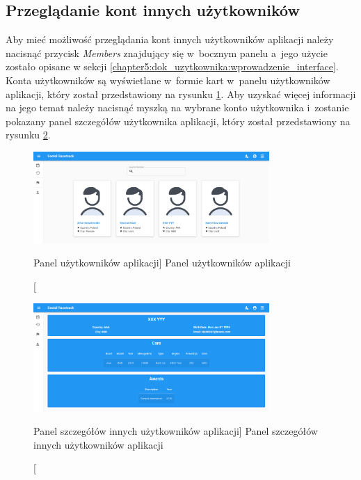 \documentclass[../Kamil_Kowalewski_Main.tex]{subfiles}
\begin{document}
{{        \subsection{Przeglądanie kont innych użytkowników}
        \label{chapter5:dok_uzytkownika:funkc_uzyt_zalog:przeglad_kont} {
            Aby mieć możliwość przeglądania kont innych użytkowników aplikacji należy
            nacisnąć przycisk \textit{Members} znajdujący się w~bocznym panelu a~jego
            użycie zostało opisane w sekcji
            \ref{chapter5:dok_uzytkownika:wprowadzenie_interface}. Konta użytkowników
            są wyświetlane w~formie kart w~panelu użytkowników aplikacji, który został
            przedstawiony na rysunku
            \ref{chapter5:dok_uzytkownika:funkc_uzyt_zalog:przeglad_kont:members_panel}.
            Aby uzyskać więcej informacji na jego temat należy nacisnąć myszką na
            wybrane konto użytkownika i~zostanie pokazany panel szczegółów użytkownika
            aplikacji, który został przedstawiony na rysunku
            \ref{chapter5:dok_uzytkownika:funkc_uzyt_zalog:przeglad_kont:member_details}.

            \begin{figure}[H]
                \centering
                \includegraphics[width=0.8\textwidth, keepaspectratio]
                {img/chapter5/loggedin/members_panel.png}
                \caption
                [Panel użytkowników aplikacji]
                {Panel użytkowników aplikacji}
                \label{chapter5:dok_uzytkownika:funkc_uzyt_zalog:przeglad_kont:members_panel}
            \end{figure}

            \begin{figure}[H]
                \centering
                \includegraphics[width=0.8\textwidth, keepaspectratio]
                {img/chapter5/loggedin/member_details.png}
                \caption
                [Panel szczegółów innych użytkowników aplikacji]
                {Panel szczegółów innych użytkowników aplikacji}
                \label{chapter5:dok_uzytkownika:funkc_uzyt_zalog:przeglad_kont:member_details}
            \end{figure}
        }

}}
\end{document}
